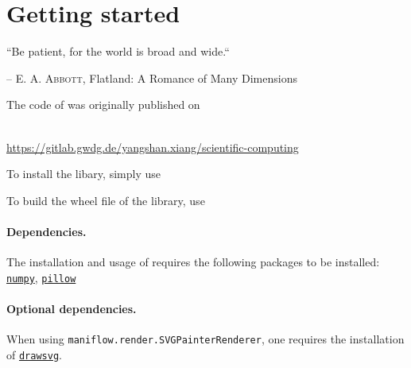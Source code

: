 \section*{Getting started}
\epigraph{\footnotesize{``Be patient, for the world is broad and wide.``}}{\footnotesize{-- \textsc{E. A. Abbott}, Flatland: A Romance of Many Dimensions }}
The code of \maniflow{} was originally published on
\begin{center}
    \\
    \vspace*{0.5cm}
    \href{https://gitlab.gwdg.de/yangshan.xiang/scientific-computing}{\url{https://gitlab.gwdg.de/yangshan.xiang/scientific-computing}}
\end{center}
To install the libary, simply use
\begin{center}
\end{center}
To build the wheel file of the library, use
\begin{center}
\end{center}
\paragraph{Dependencies.} The installation and usage of \maniflow{} requires the following packages to be installed: \href{https://numpy.org/}{\texttt{numpy}}, \href{https://pillow.readthedocs.io/en/stable/}{\texttt{pillow}}
\paragraph{Optional dependencies.} When using \texttt{maniflow.render.SVGPainterRenderer}, one requires the installation of \href{https://pypi.org/project/drawsvg/}{\texttt{drawsvg}}.